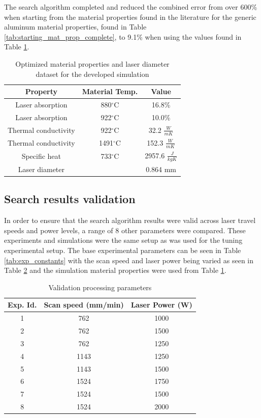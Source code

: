 \documentclass[pdflatex,sn-mathphys]{sn-jnl}
\newcommand{\degree}{$^\circ$}
\begin{document}
	The search algorithm completed and reduced the combined error from over 600\% when starting from the material properties found in the literature for the generic aluminum material properties, found in Table \ref{tab:starting_mat_prop_complete}, to 9.1\% when using the values found in Table \ref{tab:7000_mat_prop_complete}.
	\begin{table}[!htb]
		\centering
		\caption{Optimized material properties and laser diameter dataset for the developed simulation}
		\label{tab:7000_mat_prop_complete}
			\begin{tabular}{|c|c|c|} \hline 
				Property & Material Temp. & Value \\ \hline
				Laser absorption & 880\degree C & 16.8\% \\ \hline
				Laser absorption & 922\degree C & 10.0\%\\ \hline
				Thermal conductivity & 922\degree C & 32.2 $\frac{W}{mK}$\\ \hline
				Thermal conductivity & 1491\degree C & 152.3 $\frac{W}{mK}$\\ \hline
				Specific heat & 733\degree C & 2957.6 $\frac{J}{kgK}$ \\ \hline
				Laser diameter & & 0.864 mm \\ \hline
			\end{tabular}
	\end{table}

	\subsection{Search results validation}
	\label{validation}

	In order to ensure that the search algorithm results were valid across laser travel speeds and power levels, a range of 8 other parameters were compared.
	These experiments and simulations were the same setup as was used for the tuning experimental setup.  The base experimental parameters can be seen in Table \ref{tab:exp_constants} with the scan speed and laser power being varied as seen in Table \ref{tab:val_parameters} and the simulation material properties were used from Table \ref{tab:7000_mat_prop_complete}.
	
	\begin{table}[!htb]
		\centering
		\caption{Validation processing parameters}
		\label{tab:val_parameters}
			\begin{tabular}{|c|c|c|} \hline 
				Exp. Id. & Scan speed (mm/min) & Laser Power (W) \\ \hline
				1 & 762 & 1000 \\ \hline  %
				2 & 762 & 1500 \\ \hline  %
				3 & 762 & 1250 \\ \hline  %
				4 & 1143 & 1250 \\ \hline %
				5 & 1143 & 1500 \\ \hline  %
				6 & 1524 & 1750 \\ \hline  %
				7 & 1524 & 1500 \\ \hline  %
				8 & 1524 & 2000 \\ \hline  %
			\end{tabular}
	\end{table}
	
\end{document}
